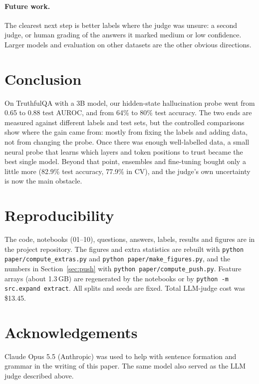 \documentclass[11pt]{article}
\begin{document}
\paragraph{Future work.} The clearest next step is better labels where the judge was unsure: a second judge, or human grading of the answers it marked medium or low confidence. Larger models and evaluation on other datasets are the other obvious directions.

\section{Conclusion}
On TruthfulQA with a 3B model, our hidden-state hallucination probe went from 0.65 to 0.88 test AUROC, and from 64\% to 80\% test accuracy. The two ends are measured against different labels and test sets, but the controlled comparisons show where the gain came from: mostly from fixing the labels and adding data, not from changing the probe. Once there was enough well-labelled data, a small neural probe that learns which layers and token positions to trust became the best single model. Beyond that point, ensembles and fine-tuning bought only a little more (82.9\% test accuracy, 77.9\% in CV), and the judge's own uncertainty is now the main obstacle.

\section*{Reproducibility}
\begin{sloppypar}
The code, notebooks (01--10), questions, answers, labels, results and figures are in the project repository. The figures and extra statistics are rebuilt with \texttt{python paper/compute\_extras.py} and \texttt{python paper/make\_figures.py}, and the numbers in Section~\ref{sec:push} with \texttt{python paper/compute\_push.py}. Feature arrays (about 1.3\,GB) are regenerated by the notebooks or by \texttt{python -m src.expand extract}. All splits and seeds are fixed. Total LLM-judge cost was \$13.45.
\end{sloppypar}

\section*{Acknowledgements}
Claude Opus 5.5 (Anthropic) was used to help with sentence formation and grammar in the writing of this paper. The same model also served as the LLM judge described above.



\end{document}
